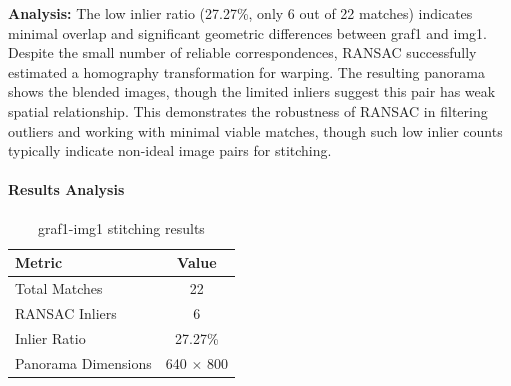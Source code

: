 \documentclass[12pt,a4paper]{article}
\begin{document}
\textbf{Analysis:} The low inlier ratio (27.27\%, only 6 out of 22 matches) indicates minimal overlap and significant geometric differences between graf1 and img1. Despite the small number of reliable correspondences, RANSAC successfully estimated a homography transformation for warping. The resulting panorama shows the blended images, though the limited inliers suggest this pair has weak spatial relationship. This demonstrates the robustness of RANSAC in filtering outliers and working with minimal viable matches, though such low inlier counts typically indicate non-ideal image pairs for stitching.

\paragraph{Results Analysis}
\begin{table}[H]
\centering
\begin{tabular}{@{}lc@{}}
\toprule
\textbf{Metric} & \textbf{Value} \\
\midrule
Total Matches & 22 \\
RANSAC Inliers & 6 \\
Inlier Ratio & 27.27\% \\
Panorama Dimensions & 640 $\times$ 800 \\
\bottomrule
\end{tabular}
\caption{graf1-img1 stitching results}
\end{table}
\end{document}
